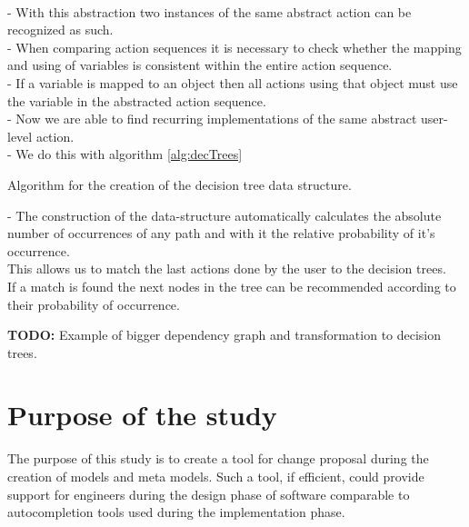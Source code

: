 \documentclass[10pt,a4paper,oneside]{scrartcl}
\begin{document}
	\\
	- With this abstraction two instances of the same abstract action can be recognized as such.
	\\
	- When comparing action sequences it is necessary to check whether the mapping and using of variables is consistent within the entire action sequence.
	\\
	- If a variable is mapped to an object then all actions using that object must use the variable in the abstracted action sequence.
	\\
	- Now we are able to find recurring implementations of the same abstract user-level action.
	\\
	- We do this with algorithm \ref{alg:decTrees}\\
		\begin{algorithm}
			\label{alg:decTrees}
		\caption{Algorithm for the creation of the decision tree data structure.}
		\end{algorithm}
	- The construction of the data-structure automatically calculates the absolute number of occurrences of any path and with it the relative probability of it's occurrence.
	\\
	This allows us to match the last actions done by the user to the decision trees. 
	\\
	If a match is found the next nodes in the tree can be recommended according to their probability of occurrence.

	\textbf{TODO:} Example of bigger dependency graph and transformation to decision trees.

	
	\section{Purpose of the study}
	The purpose of this study is to create a tool for change proposal during the creation of models and meta models. Such a tool, if efficient, could provide support for engineers during the design phase of software comparable to autocompletion tools used during the implementation phase. 
	
\end{document}
